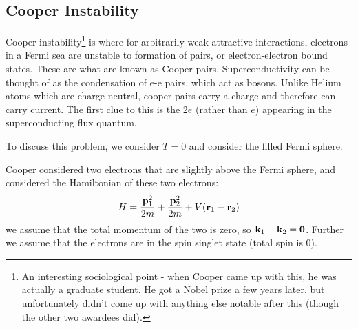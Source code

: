 \subsection{Cooper Instability}
Cooper instability\footnote{An interesting sociological point - when Cooper came up with this, he was actually a graduate student. He got a Nobel prize a few years later, but unfortunately didn't come up with anything else notable after this (though the other two awardees did). } is where for arbitrarily weak attractive interactions, electrons in a Fermi sea are unstable to formation of pairs, or electron-electron bound states. These are what are known as Cooper pairs. Superconductivity can be thought of as the condensation of e-e pairs, which act as bosons. Unlike Helium atoms which are charge neutral, cooper pairs carry a charge and therefore can carry current. The first clue to this is the $2e$ (rather than $e$) appearing in the superconducting flux quantum.

To discuss this problem, we consider $T = 0$ and consider the filled Fermi sphere.

Cooper considered two electrons that are slightly above the Fermi sphere, and considered the Hamiltonian of these two electrons:
\begin{equation}
    H = \frac{\mathbf{p}_1^2}{2m} + \frac{\mathbf{p}_2^2}{2m} + V(\mathbf{r}_1 - \mathbf{r}_2)
\end{equation}
we assume that the total momentum of the two is zero, so $\mathbf{k}_1 + \mathbf{k}_2 = \mathbf{0}$. Further we assume that the electrons are in the spin singlet state (total spin is 0).

